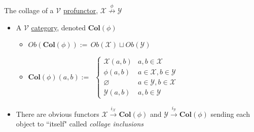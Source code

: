 The collage of a $\mathcal{V}$ \href{doc/1 math/Seven Sketches in Compositionality/Chapter 4: Co-design/2 Enriched profunctors/2 V-profunctors/1 V-profunctor}{profunctor}, $\mathcal{X}\overset{\phi}\nrightarrow \mathcal{Y}$

\begin{itemize}
    \item A $\mathcal{V}$ \href{doc/1 math/Seven Sketches in Compositionality/Chapter 2: Resource theories/3 Enrichment/1 V-categories/1 V-category}{category}, denoted $\mathbf{Col}(\phi)$
          \begin{itemize}
            \item $Ob(\mathbf{Col}(\phi)):=$\,$Ob(\mathcal{X})\sqcup Ob(\mathcal{Y})$\,
            \item $\mathbf{Col}(\phi)(a,b) :=$ \,$\begin{cases}\mathcal{X}(a,b) & a,b \in \mathcal{X} \\ \phi(a,b)& a \in \mathcal{X}, b \in \mathcal{Y} \\ \varnothing & a \in \mathcal{Y}, b \in \mathcal{X} \\ \mathcal{Y}(a,b) & a,b \in \mathcal{Y} \end{cases}$\,
          \end{itemize}
    \item There are obvious functors $\mathcal{X}\xrightarrow{i_\mathcal{X}}\mathbf{Col}(\phi)$ and $\mathcal{Y}\xrightarrow{i_\mathcal{Y}}\mathbf{Col}(\phi)$ sending each object to ``itself" called \emph{collage inclusions}

  \end{itemize}
